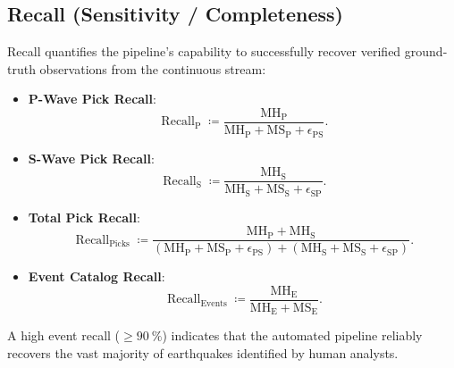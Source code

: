 \subsection{Recall (Sensitivity / Completeness)}
Recall quantifies the pipeline's capability to successfully recover
verified ground-truth observations from the continuous stream:
\begin{itemize}
  \item \textbf{P-Wave Pick Recall}:
    \begin{equation}
      \operatorname{Recall}_{\mathrm{P}} \coloneqq
      \frac{\mathrm{MH}_{\mathrm{P}}}{\mathrm{MH}_{\mathrm{P}} +
      \mathrm{MS}_{\mathrm{P}} + \epsilon_{\mathrm{PS}}}.
    \end{equation}
  \item \textbf{S-Wave Pick Recall}:
    \begin{equation}
      \operatorname{Recall}_{\mathrm{S}} \coloneqq
      \frac{\mathrm{MH}_{\mathrm{S}}}{\mathrm{MH}_{\mathrm{S}} +
      \mathrm{MS}_{\mathrm{S}} + \epsilon_{\mathrm{SP}}}.
    \end{equation}
  \item \textbf{Total Pick Recall}:
    \begin{equation}
      \operatorname{Recall}_{\mathrm{Picks}} \coloneqq
      \frac{\mathrm{MH}_{\mathrm{P}} +
      \mathrm{MH}_{\mathrm{S}}}{\left(\mathrm{MH}_{\mathrm{P}} +
        \mathrm{MS}_{\mathrm{P}} + \epsilon_{\mathrm{PS}}\right) +
        \left(\mathrm{MH}_{\mathrm{S}} + \mathrm{MS}_{\mathrm{S}} +
      \epsilon_{\mathrm{SP}}\right)}.
    \end{equation}
  \item \textbf{Event Catalog Recall}:
    \begin{equation}
      \operatorname{Recall}_{\mathrm{Events}} \coloneqq
      \frac{\mathrm{MH}_{\mathrm{E}}}{\mathrm{MH}_{\mathrm{E}} +
      \mathrm{MS}_{\mathrm{E}}}.
    \end{equation}
\end{itemize}

A high event recall ($\ge \qty{90}{\percent}$) indicates that the automated
pipeline reliably recovers the vast majority of earthquakes
identified by human analysts.

